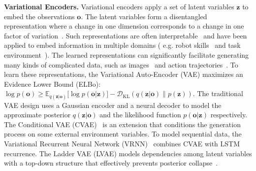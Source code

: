 \documentclass{article}
\newcommand{\latentvariables}{\mathbf{z}}
\newcommand{\inference}{q}
\newcommand{\generation}{p}
\newcommand{\observation}{\boldsymbol{o}}
\newcommand{\system}{VaRLAE\;}
\begin{document}
{\bf Variational Encoders.} Variational encoders apply a set of latent variables $\latentvariables$ to embed the observations $\observation$. The latent variables form a disentangled representation where a change in one dimension corresponds to a change in one factor of variation~\cite{BengioRepresentation13}. Such representations are often interpretable~\cite{KimM18,Higgins17BetaVAE} and have been applied to embed information in multiple domains ( e.g. robot skills~\cite{HausmanEmbedSkills18} and task environment~\cite{zintgraf2019variational}).
The learned representations can significantly facilitate generating many kinds of complicated data, such as images~\cite{kingma2013auto,WalkerDGH16} and action trajectories~\cite{Zhan19basketballvrnn,Sun19basketballvrnn}. To learn these representations, the Variational Auto-Encoder (VAE) maximizes an Evidence Lower Bound (ELBo): $\log p(\observation) \geq \mathbb{E}_{\inference(\latentvariables|\observation)}\Big[\log\generation(\observation|\latentvariables)\Big] -\mathcal{D}_{\text{KL}}(\inference(\latentvariables|\observation)\| p(\latentvariables))$. The traditional VAE design uses 
a Gaussian encoder and a neural decoder to model the approximate posterior $\inference(\latentvariables|\observation)$ and the likelihood function $\generation(\observation|\latentvariables)$ respectively. 
The Conditional VAE (CVAE)~\cite{WalkerDGH16} is an extension that conditions the generation process on some external environment variables. To model sequential data, the Variational Recurrent Neural Network (VRNN)~\cite{ChungKDGCB15}  combines CVAE with LSTM recurrence. 
The Ladder VAE (LVAE) models dependencies among latent variables with a top-down structure that effectively prevents posterior collapse~\cite{SonderbyLadderVAE16}. 
\end{document}
